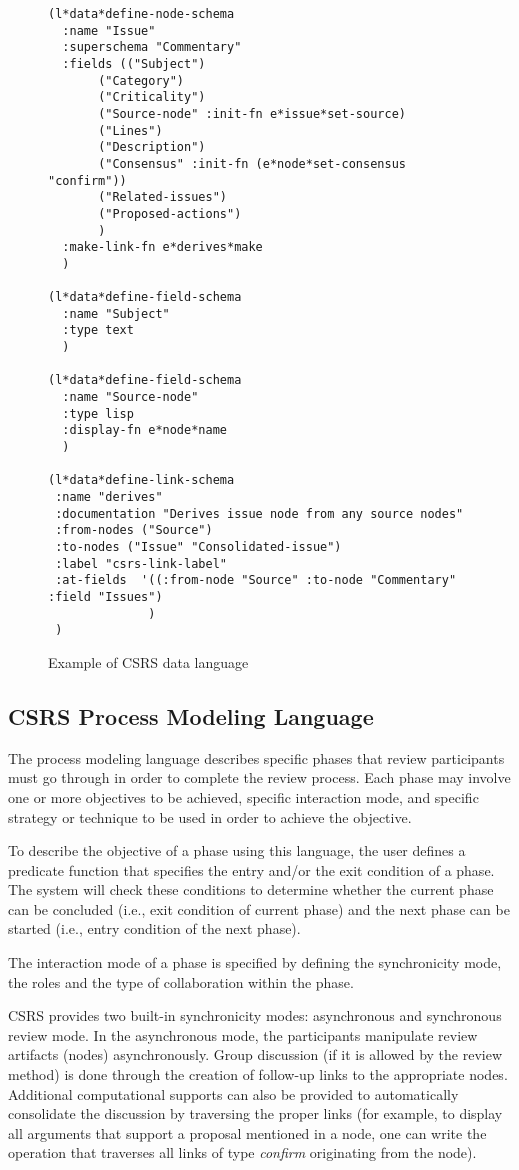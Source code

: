 \begin{figure}[tp]
  \footnotesize
  \begin{verbatim}
(l*data*define-node-schema
  :name "Issue"
  :superschema "Commentary"
  :fields (("Subject")
	   ("Category")
	   ("Criticality")
	   ("Source-node" :init-fn e*issue*set-source)
	   ("Lines")
	   ("Description")
	   ("Consensus" :init-fn (e*node*set-consensus "confirm"))
	   ("Related-issues")
	   ("Proposed-actions")
	   )
  :make-link-fn e*derives*make
  )

(l*data*define-field-schema
  :name "Subject"
  :type text
  )

(l*data*define-field-schema
  :name "Source-node"
  :type lisp
  :display-fn e*node*name
  )

(l*data*define-link-schema
 :name "derives"
 :documentation "Derives issue node from any source nodes"
 :from-nodes ("Source")
 :to-nodes ("Issue" "Consolidated-issue")
 :label "csrs-link-label"
 :at-fields  '((:from-node "Source" :to-node "Commentary" :field "Issues")
              )
 )

  \end{verbatim}
  \normalsize
  \caption{Example of CSRS data language}
  \label{fig:data-language}
\end{figure}



\subsection{CSRS Process Modeling Language}

The process modeling language describes specific phases that
review participants must go through in order to complete the review
process. 
Each phase  may involve one or more objectives to be
achieved, specific interaction mode, and specific strategy or
technique to be used in order to achieve the objective. 

To describe the objective of a phase using this language, the user
defines a predicate function that specifies the entry and/or the exit
condition of a phase. The system will check these conditions to
determine whether the current phase can be concluded (i.e., exit
condition of current phase) and the next phase can be started (i.e.,
entry condition of the next phase). 

The interaction mode of a phase is specified by defining the
synchronicity mode, the roles and the type of collaboration within the
phase. 

CSRS provides two built-in synchronicity modes: asynchronous
and synchronous review mode. In the asynchronous mode, the
participants manipulate review artifacts (nodes) asynchronously.
Group discussion (if it is allowed by the review method) is done
through the creation of follow-up links to the appropriate nodes. 
Additional computational supports can
also be provided to automatically consolidate the discussion by 
traversing the proper links (for example, to display all arguments that
support a proposal mentioned in a node, one can write the operation
that traverses all links of type {\it confirm} originating from the
node). 

